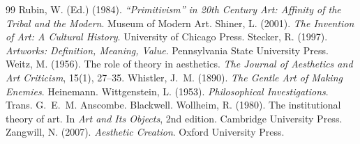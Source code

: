 \documentclass{situationist-preprint}
\begin{document}
\begin{thebibliography}{99}
 Rubin, W. (Ed.) (1984). \emph{\enquote{Primitivism} in 20th Century Art: Affinity of the Tribal and the Modern}. Museum of Modern Art.
 Shiner, L. (2001). \emph{The Invention of Art: A Cultural History}. University of Chicago Press.
 Stecker, R. (1997). \emph{Artworks: Definition, Meaning, Value}. Pennsylvania State University Press.
 Weitz, M. (1956). The role of theory in aesthetics. \emph{The Journal of Aesthetics and Art Criticism}, 15(1), 27--35.
 Whistler, J.~M. (1890). \emph{The Gentle Art of Making Enemies}. Heinemann.
 Wittgenstein, L. (1953). \emph{Philosophical Investigations}. Trans. G.~E.~M. Anscombe. Blackwell.
 Wollheim, R. (1980). The institutional theory of art. In \emph{Art and Its Objects}, 2nd edition. Cambridge University Press.
 Zangwill, N. (2007). \emph{Aesthetic Creation}. Oxford University Press.
\end{thebibliography}
\end{document}
